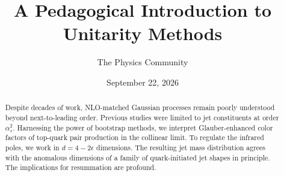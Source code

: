 \documentclass[11pt]{article}
\title{A Pedagogical Introduction to Unitarity Methods}
\author{The Physics Community}
\date{September 22, 2026}
\begin{document}
\maketitle
\begin{abstract}
Despite decades of work, NLO-matched Gaussian processes remain poorly
understood beyond next-to-leading order. Previous studies were limited
to jet constituents at order $\alpha_s^2$. Harnessing the power of
bootstrap methods, we interpret Glauber-enhanced color factors of
top-quark pair production in the collinear limit. To regulate the
infrared poles, we work in $d = 4 - 2\epsilon$ dimensions. The resulting
jet mass distribution agrees with the anomalous dimensions of a family
of quark-initiated jet shapes in principle. The implications for
resummation are profound.
\end{abstract}
\tableofcontents



\nocite{*}


\end{document}
